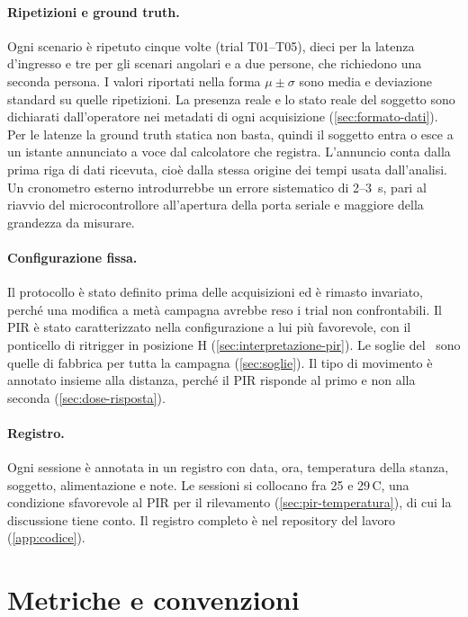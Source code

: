 \paragraph{Ripetizioni e ground truth.} Ogni scenario è ripetuto cinque volte
(trial T01--T05), dieci per la latenza d'ingresso e tre per gli scenari angolari e a
due persone, che richiedono una seconda persona. I valori riportati nella forma
$\mu \pm \sigma$ sono media e deviazione standard su quelle ripetizioni. La presenza
reale e lo stato reale del soggetto sono dichiarati dall'operatore nei metadati di
ogni acquisizione (\cref{sec:formato-dati}). Per le latenze la ground truth statica
non basta, quindi il soggetto entra o esce a un istante annunciato a voce dal
calcolatore che registra. L'annuncio conta dalla prima riga di dati ricevuta, cioè
dalla stessa origine dei tempi usata dall'analisi. Un cronometro esterno
introdurrebbe un errore sistematico di 2--3~s, pari al riavvio del microcontrollore
all'apertura della porta seriale e maggiore della grandezza da misurare.

\paragraph{Configurazione fissa.} Il protocollo è stato definito prima delle
acquisizioni ed è rimasto invariato, perché una modifica a metà campagna avrebbe
reso i trial non confrontabili. Il PIR è stato caratterizzato nella configurazione a
lui più favorevole, con il ponticello di ritrigger in posizione H
(\cref{sec:interpretazione-pir}). Le soglie del \ldb\ sono quelle di fabbrica per
tutta la campagna (\cref{sec:soglie}). Il tipo di movimento è annotato insieme alla
distanza, perché il PIR risponde al primo e non alla seconda (\cref{sec:dose-risposta}).

\paragraph{Registro.} Ogni sessione è annotata in un registro con data, ora,
temperatura della stanza, soggetto, alimentazione e note. Le sessioni si collocano
fra 25 e 29\,\textdegree C, una condizione sfavorevole al PIR per il rilevamento
(\cref{sec:pir-temperatura}), di cui la discussione tiene conto. Il registro completo
è nel repository del lavoro (\cref{app:codice}).

\section{Metriche e convenzioni}
\label{sec:metriche}

